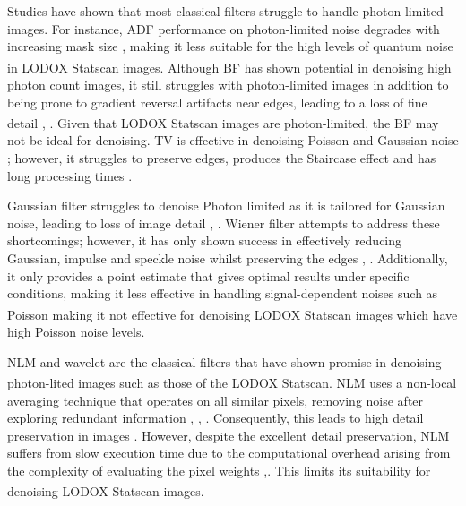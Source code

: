 Studies have shown that most classical filters struggle to handle photon-limited images. For instance, \gls{ADF} performance on photon-limited noise degrades with increasing mask size \cite{chandra_analysis_2020}, making it less suitable for the high levels of quantum noise in LODOX\textsuperscript{\textregistered} Statscan\textsuperscript{\textregistered} images. Although  \gls{BF} has shown potential in denoising high photon count images, it still struggles with photon-limited images  \cite{thanh_review_2019} in addition to being prone to gradient reversal artifacts near edges, leading to a loss of fine detail \cite{juneja_denoising_2024}, \cite{chandra_analysis_2020}. Given that LODOX\textsuperscript{\textregistered} Statscan\textsuperscript{\textregistered} images are photon-limited, the \gls{BF} may not be ideal for denoising. \gls{TV} is effective in denoising Poisson and Gaussian noise \cite{rodrigues_denoising_2008}; however, it struggles to preserve edges, produces the \gls{Staircase effect} \cite{rodrigues_denoising_2008} and has long processing times \cite{lee_x-ray_2018}.

Gaussian filter struggles to denoise Photon limited as it is tailored for  Gaussian noise, leading to loss of image detail \cite{juneja_denoising_2024}, \cite{khan_new_2016}. Wiener filter attempts to address these shortcomings; however, it has only shown success in effectively reducing Gaussian, impulse and speckle noise whilst preserving the edges \cite{chandra_analysis_2020}, \cite{wang_noise_2008}. Additionally, it only provides a point estimate that gives optimal results under specific conditions, making it less effective in handling signal-dependent noises such as Poisson \cite{juneja_denoising_2024} making it not effective for denoising LODOX\textsuperscript{\textregistered} Statscan\textsuperscript{\textregistered} images which have high Poisson noise levels. 

\gls{NLM} and wavelet are the classical filters that have shown promise in denoising photon-lited images such as those of the LODOX\textsuperscript{\textregistered} Statscan\textsuperscript{\textregistered}. \gls{NLM} uses a non-local averaging technique that operates on all similar pixels, removing noise after exploring redundant information \cite{juneja_denoising_2024}, \cite{khan_new_2016}, \cite{rodrigues_denoising_2008}. Consequently, this leads to high detail preservation in images \cite{rodrigues_denoising_2008}. However, despite the excellent detail preservation, \gls{NLM} suffers from slow execution time due to the computational overhead arising from the complexity of evaluating the pixel weights \cite{juneja_denoising_2024},\cite{rodrigues_denoising_2008}. This limits its suitability for denoising LODOX\textsuperscript{\textregistered} Statscan\textsuperscript{\textregistered} images.

